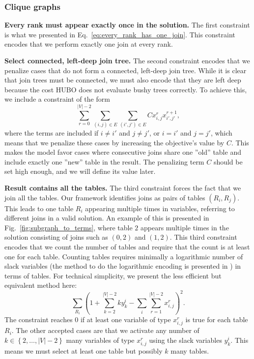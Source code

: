 \subsubsection*{Clique graphs}
\textbf{Every rank must appear exactly once in the solution.} The first constraint is what we presented in Eq.~\eqref{eq:every_rank_has_one_join}. This constraint encodes that we perform exactly one join at every rank.

\textbf{Select connected, left-deep join tree.} The second constraint encodes that we penalize cases that do not form a connected, left-deep join tree. While it is clear that join trees must be connected, we must also encode that they are left deep because the cost HUBO does not evaluate bushy trees correctly. To achieve this, we include a constraint of the form
\begin{equation}\label{eq:respect_clique_graph}
    \sum_{r = 0}^{|V| - 2}\sum_{(i,j) \in E}\sum_{(i',j') \in E}Cx_{i,j}^{r}x_{i',j'}^{r+1},
\end{equation}
where the terms are included if $i \neq i'$ and $j \neq j'$, or $i = i'$ and $j = j'$, which means that we penalize these cases by increasing the objective's value by $C$. This makes the model favor cases where consecutive joins share one ''old'' table and include exactly one ''new'' table in the result. The penalizing term $C$ should be set high enough, and we will define its value later.

\textbf{Result contains all the tables.} The third constraint forces the fact that we join all the tables. Our framework identifies joins as pairs of tables $(R_i, R_j)$. This leads to one table $R_i$ appearing multiple times in variables, referring to different joins in a valid solution. An example of this is presented in Fig.~\ref{fig:subgraph_to_terms}, where table $2$ appears multiple times in the solution consisting of joins such as $(0,2)$ and $(1,2)$. This third constraint encodes that we count the number of tables and require that the count is at least one for each table. Counting tables requires minimally a logarithmic number of slack variables (the method to do the logarithmic encoding is presented in \cite{lucas_2014}) in terms of tables. For technical simplicity, we present the less efficient but equivalent method here:
\begin{equation*}
    \sum_{R_i}\left( 1 + \sum_{k = 2}^{|V| - 2}ky^{i}_{k} - \sum_{i}\sum_{r = 1}^{|V| - 2} x_{i,j}^{r} \right)^2.
\end{equation*}
The constraint reaches 0 if at least one variable of type $x_{i,j}^{r}$ is true for each table $R_i$. The other accepted cases are that we activate any number of $k \in \left\{ 2, \ldots, |V| - 2 \right\}$ many variables of type $x_{i,j}^{r}$ using the slack variables $y^{i}_{k}$. This means we must select at least one table but possibly $k$ many tables.